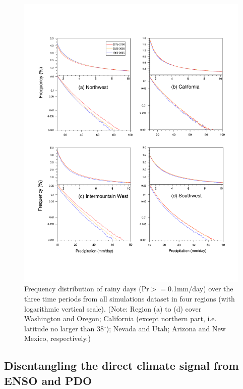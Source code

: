 \begin{figure}
\begin{center}
\includegraphics[width=6in]{PP_PDF_region1_4.pdf}
\caption{Frequency distribution of rainy days (Pr$>=$0.1mm$/$day) over the three time periods from all simulations dataset in four regions (with logarithmic vertical scale). (Note: Region (a) to (d) cover Washington and Oregon; California (except northern part, i.e. latitude no larger than 38$^\circ$); Nevada and Utah; Arizona and New Mexico, respectively.)}
\label{fig:prPDF}
\end{center}
\end{figure}

\subsection{Disentangling the direct climate signal from ENSO and PDO} \label{sec:IsolatingENSO}

